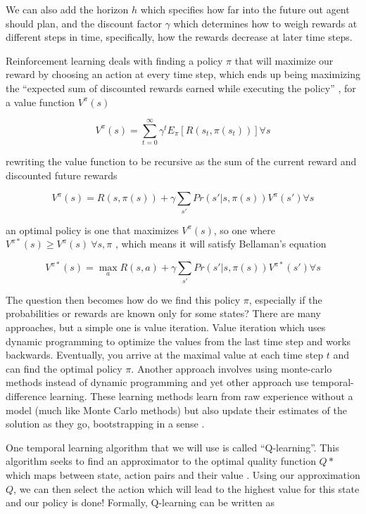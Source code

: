 \documentclass[letterpaper,12pt,titlepage,oneside,final]{book}
\begin{document}
We can also add the horizon $h$ which specifies how far into the future out agent should plan, and the discount factor $\gamma$ which determines how to weigh rewards at different steps in time, specifically, how the rewards decrease at later time steps.


Reinforcement learning deals with finding a policy $\pi$ that will maximize our reward by choosing an action at every time step, which ends up being maximizing the ``expected sum of discounted rewards earned while executing the policy'' \cite{pascal-mdp}, for a value function $V^\pi(s)$

\begin{equation}
	V^\pi(s) = \sum_{t=0}^{\infty} \gamma^{t}E_{\pi}[R(s_t, \pi(s_t))] \forall s
\end{equation}

rewriting the value function to be recursive as the sum of the current reward and discounted future rewards

\begin{equation}
	V^\pi(s) = R(s, \pi(s)) + \gamma \sum_{s'} Pr(s'|s, \pi(s)) V^\pi(s') \forall s
\end{equation}

an optimal policy is one that maximizes $V^\pi (s)$, so one where $V^{\pi *}(s) \ge V^{\pi}(s) \ \forall s, \pi$ \cite{pascal-mdp}, which means it will satisfy Bellaman's equation

\begin{equation}
	V^{\pi *}(s) = \max_{a} R(s, a) + \gamma \sum_{s'} Pr(s'|s, \pi(s)) V^{\pi *}(s') \forall s
\end{equation}


The question then becomes how do we find this policy $\pi$, especially if the probabilities or rewards are known only for some states? There are many approaches, but a simple one is value iteration. Value iteration which uses dynamic programming to optimize the values from the last time step and works backwards. Eventually, you arrive at the maximal value at each time step $t$ and can find the optimal policy $\pi$. Another approach involves using monte-carlo methods instead of dynamic programming and yet other approach use temporal-difference learning. These learning methods learn from raw experience without a model (much like Monte Carlo methods) but also update their estimates of the solution as they go, bootstrapping in a sense \cite{sutton-barto}.

One temporal learning algorithm that we will use is called ``Q-learning''. This algorithm seeks to find an approximator to the optimal quality function $Q*$ which maps between state, action pairs and their value \cite{sutton-barto}. Using our approximation $Q$, we can then select the action which will lead to the highest value for this state and our policy is done! Formally, Q-learning can be written as 
\end{document}
